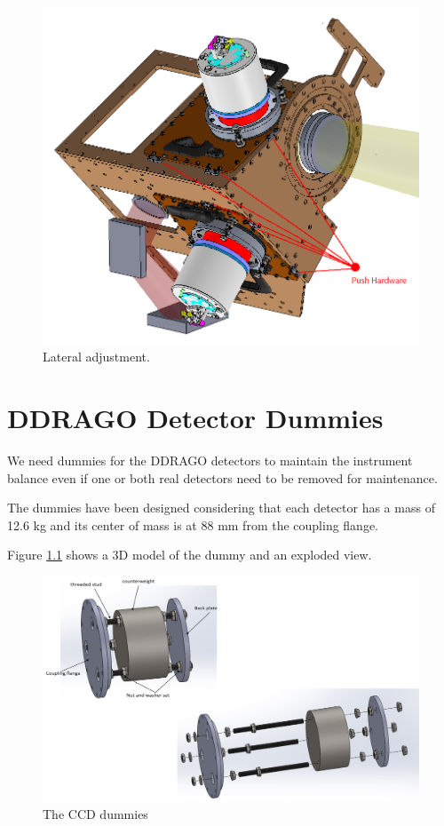 \documentclass{report}
\begin{document}
\begin{figure}
\centering
\includegraphics[width=1\linewidth]{figures/PushMounts.png}
\caption{Lateral adjustment.}
\label{figure:PushMounts}
\end{figure}

\chapter{DDRAGO Detector Dummies}

We need dummies for the DDRAGO detectors to maintain the instrument balance even if one or both real detectors need to be removed for maintenance.

The dummies have been designed considering that each detector has a mass of 12.6 kg and its center of mass is at 88 mm from the coupling flange.

Figure \ref{figure:ccd-dummy} shows a 3D model of the dummy and an exploded view.

\begin{figure}
    \centering
    \includegraphics[width=0.7\linewidth]{figures/CCD-dummy.png}
    \caption{The CCD dummies}
    \label{figure:ccd-dummy}
\end{figure}
\end{document}
